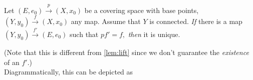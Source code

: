 \documentclass[12pt]{article}
\begin{document}
\begin{thm} \label{thm:uniquelift}
	Let $(E, e_0) \overset{p}{\longrightarrow} (X, x_0)$ be a covering space with base points, $(Y, y_0) \overset{f}{\longrightarrow} (X, x_0)$ any map. Assume that $Y$ is connected. \emph{If} there is a map $(Y, y_0) \overset{f'}{\longrightarrow}(E, e_0)$ such that $pf' = f,$ \emph{then} it is unique.
\end{thm}
(Note that this is different from \cref{lem:lift} since we don't guarantee the \emph{existence} of an $f'.$)\\
Diagrammatically, this can be depicted as
\begin{center}
\end{center}
\end{document}
